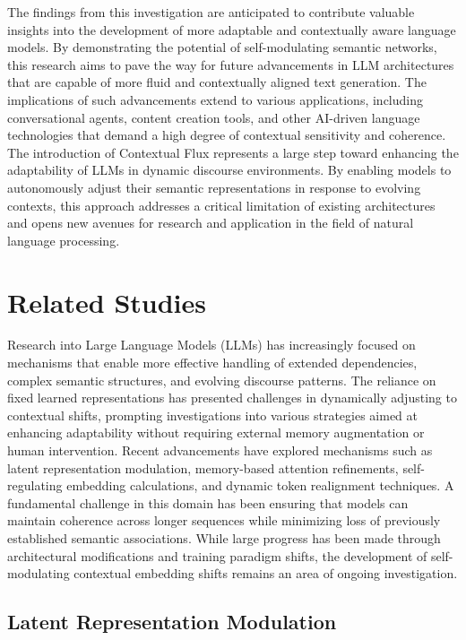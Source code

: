\documentclass{article}
\begin{document}
The findings from this investigation are anticipated to contribute valuable insights into the development of more adaptable and contextually aware language models. By demonstrating the potential of self-modulating semantic networks, this research aims to pave the way for future advancements in LLM architectures that are capable of more fluid and contextually aligned text generation. The implications of such advancements extend to various applications, including conversational agents, content creation tools, and other AI-driven language technologies that demand a high degree of contextual sensitivity and coherence. The introduction of Contextual Flux represents a large step toward enhancing the adaptability of LLMs in dynamic discourse environments. By enabling models to autonomously adjust their semantic representations in response to evolving contexts, this approach addresses a critical limitation of existing architectures and opens new avenues for research and application in the field of natural language processing.




\section{Related Studies}

Research into Large Language Models (LLMs) has increasingly focused on mechanisms that enable more effective handling of extended dependencies, complex semantic structures, and evolving discourse patterns. The reliance on fixed learned representations has presented challenges in dynamically adjusting to contextual shifts, prompting investigations into various strategies aimed at enhancing adaptability without requiring external memory augmentation or human intervention. Recent advancements have explored mechanisms such as latent representation modulation, memory-based attention refinements, self-regulating embedding calculations, and dynamic token realignment techniques. A fundamental challenge in this domain has been ensuring that models can maintain coherence across longer sequences while minimizing loss of previously established semantic associations. While large progress has been made through architectural modifications and training paradigm shifts, the development of self-modulating contextual embedding shifts remains an area of ongoing investigation.

\subsection{Latent Representation Modulation}
\end{document}
